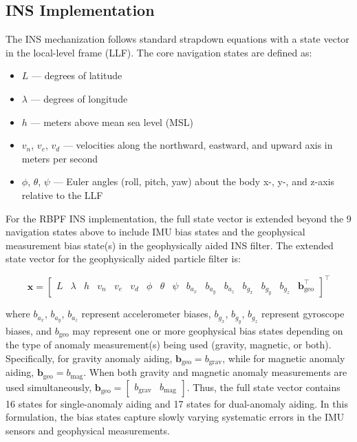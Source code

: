 \documentclass[letterpaper,times]{IONconf}
\begin{document}
\subsection{INS Implementation}

The INS mechanization follows standard strapdown equations \citep[Chapter 5.3]{groves} with a state vector in the local-level frame (LLF). The core navigation states are defined as:
\begin{itemize}
    \item \(L\) --- degrees of latitude
    \item \(\lambda\) --- degrees of longitude
    \item \(h\) --- meters above mean sea level (MSL)
    \item \(v_n\), \(v_e\), \(v_d\) --- velocities along the northward, eastward, and upward axis in meters per second
    \item \(\phi\), \(\theta\), \(\psi\) --- Euler angles (roll, pitch, yaw) about the body x-, y-, and z-axis relative to the LLF
\end{itemize}

For the RBPF INS implementation, the full state vector is extended beyond the 9 navigation states above to include IMU bias states and the geophysical measurement bias state(s) in the geophysically aided INS filter. The extended state vector for the geophysically aided particle filter is:

\begin{equation}
\label{eqn:rbpf-state-vector}
\mathbf{x} = \left[\begin{array}{cccccccccccccccc}
  L & \lambda & h & v_n & v_e & v_d & \phi & \theta & \psi & b_{a_x} & b_{a_y} & b_{a_z} & b_{g_x} & b_{g_y} & b_{g_z} & \mathbf{b}_{\text{geo}}^\intercal
\end{array}\right]^\intercal
\end{equation}

where \(b_{a_x}\), \(b_{a_y}\), \(b_{a_z}\) represent accelerometer biases, \(b_{g_x}\), \(b_{g_y}\), \(b_{g_z}\) represent gyroscope biases, and \(b_{\text{geo}}\) may represent one or more geophysical bias states depending on the type of anomaly measurement(s) being used (gravity, magnetic, or both). Specifically, for gravity anomaly aiding, \(\mathbf{b}_{\text{geo}} = b_{\text{grav}}\), while for magnetic anomaly aiding, \(\mathbf{b}_{\text{geo}} = b_{\text{mag}}\). When both gravity and magnetic anomaly measurements are used simultaneously, \(\mathbf{b}_{\text{geo}} = \begin{bmatrix} b_{\text{grav}} & b_{\text{mag}} \end{bmatrix}\). Thus, the full state vector contains 16 states for single-anomaly aiding and 17 states for dual-anomaly aiding. In this formulation, the bias states capture slowly varying systematic errors in the IMU sensors and geophysical measurements.
\end{document}
